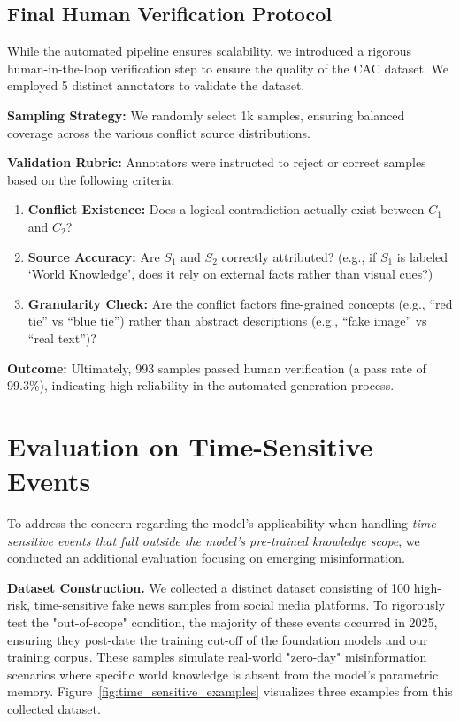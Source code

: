 \documentclass{article}
\theoremstyle{plain}
\theoremstyle{definition}
\theoremstyle{remark}
\begin{document}
\subsection{Final Human Verification Protocol}
While the automated pipeline ensures scalability, we introduced a rigorous human-in-the-loop verification step to ensure the quality of the CAC dataset. We employed 5 distinct annotators to validate the dataset.

\textbf{Sampling Strategy:} We randomly select 1k samples, ensuring balanced coverage across the various conflict source distributions.

\textbf{Validation Rubric:} Annotators were instructed to reject or correct samples based on the following criteria:
\begin{enumerate}
    \item \textbf{Conflict Existence:} Does a logical contradiction actually exist between $C_1$ and $C_2$?
    \item \textbf{Source Accuracy:} Are $S_1$ and $S_2$ correctly attributed? (e.g., if $S_1$ is labeled `World Knowledge', does it rely on external facts rather than visual cues?)
    \item \textbf{Granularity Check:} Are the conflict factors fine-grained concepts (e.g., ``red tie'' vs ``blue tie'') rather than abstract descriptions (e.g., ``fake image'' vs ``real text'')?
\end{enumerate}

\textbf{Outcome:} Ultimately, 993 samples passed human verification (a pass rate of 99.3\%), indicating high reliability in the automated generation process.

\section{Evaluation on Time-Sensitive Events}
\label{sec:time_sensitive}

To address the concern regarding the model's applicability when handling \textit{time-sensitive events that fall outside the model’s pre-trained knowledge scope}, we conducted an additional evaluation focusing on emerging misinformation.

\textbf{Dataset Construction.} We collected a distinct dataset consisting of 100 high-risk, time-sensitive fake news samples from social media platforms. To rigorously test the "out-of-scope" condition, the majority of these events occurred in 2025, ensuring they post-date the training cut-off of the foundation models and our training corpus. These samples simulate real-world "zero-day" misinformation scenarios where specific world knowledge is absent from the model's parametric memory. Figure~\ref{fig:time_sensitive_examples} visualizes three examples from this collected dataset.
\end{document}
